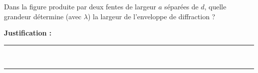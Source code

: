 Dans la figure produite par deux fentes de largeur $a$ séparées de $d$, quelle grandeur détermine (avec $\lambda$) la largeur de l'enveloppe de diffraction ?

\choices

\noindent\textbf{Justification :} \hrulefill \\[2.5ex]
\rule{\linewidth}{0.4pt} \\[2.5ex]
\rule{\linewidth}{0.4pt}
\vfill
